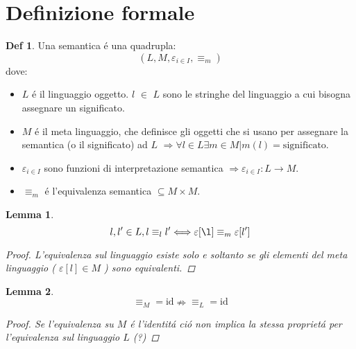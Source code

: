 \documentclass[a4paper]{report}
\theoremstyle{definition} \newtheorem*{defi}{Def}
\theoremstyle{plain} \newtheorem{lemma}{Lemma}
\theoremstyle{plain} \newtheorem{teo}{Teorema}
\theoremstyle{remark} \newtheorem*{es}{Esempio}
\begin{document}
\section{Definizione formale}
\begin{defi}
	Una semantica \'e una quadrupla:
	\begin{equation}
	\left(L,M, \varepsilon_{i\in I}, \equiv_m\right)
	\end{equation}
	dove:
	\begin{itemize}
		\item $L$ \'e il linguaggio oggetto. $l$ $\in$ $L$ sono le stringhe del linguaggio a cui bisogna assegnare un significato.
		\item $M$ \'e il meta linguaggio, che definisce gli oggetti che si usano per assegnare la semantica (o il significato) ad $L$ $\Rightarrow \forall l \in L \exists m \in M | m(l) = \mathrm{significato}$.
		\item $\varepsilon_{i\in I}$ sono funzioni di interpretazione semantica $\Rightarrow \varepsilon_{i\in I} : L \rightarrow M $.
		\item $\equiv_m$ \'e l'equivalenza semantica $\subseteq M \times M$.
	\end{itemize}
\end{defi}
\begin{lemma}
	\begin{equation}
		l,l' \in L, l \equiv_l l' \Longleftrightarrow \varepsilon[\l] \equiv_m \varepsilon[l']
	\end{equation}
	\begin{proof}
		L'equivalenza sul linguaggio esiste solo e soltanto se gli elementi del meta linguaggio ( $\varepsilon[l] \in M$ ) sono equivalenti.
	\end{proof}
\end{lemma}
\begin{lemma}
	\begin{equation}
		\equiv_M = \mathrm{id} \nRightarrow \equiv_L = \mathrm{id}
	\end{equation}
	\begin{proof}
		Se l'equivalenza su $M$ \'e l'identit\'a ci\'o non implica la stessa propriet\'a per l'equivalenza sul linguaggio $L$ (?)
	\end{proof}
\end{lemma}
\end{document}
